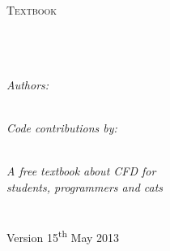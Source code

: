 \documentclass[11pt, a4paper, oneside]{Thesis} %
\begin{document}
\begin{titlepage}
\begin{center}

\textsc{\LARGE \univname}\\[1.5cm] %
\textsc{\Large Textbook}\\[0.5cm] %

\HRule \\[0.4cm] %
{\huge \bfseries \ttitle}\\[0.4cm] %
\HRule \\[1.5cm] %
 
\begin{minipage}{0.4\textwidth}
\begin{flushleft} \large
\emph{Authors: }\\
\href{mailto:jathavansriram@aol.de}{\authornames}\\ %
\end{flushleft}
\end{minipage}
\begin{minipage}{0.4\textwidth}
\begin{flushright} \large
\emph{Code contributions by:} \\
\href{rnd@nablavfx.com}{\supname} %
\end{flushright}
\end{minipage}\\[3cm]
 
\large \textit{A free textbook about CFD for }\\[0.3cm] %
\textit{students, programmers and cats}\\[0.4cm]
\groupname\\\deptname\\[2cm] %
 
{ Version \large 15\textsuperscript{th} May 2013 }\\[2cm] %
\vfill

\begin{minipage}{0.8\textwidth}
\begin{flushleft} \large
\addressnames
\end{flushleft}
\end{minipage}



\end{center}

\end{titlepage}
\end{document}
